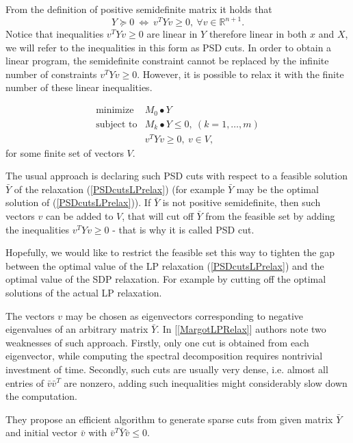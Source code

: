 \documentclass[12pt]{book}
\theoremstyle{definition}
\begin{document}
From the definition of positive semidefinite matrix it holds that
\begin{equation}
Y\succeq 0 \ \Leftrightarrow \ v^TYv \geq 0, \ \forall v\in\mathbb{R}^{n+1}.
\end{equation}
Notice that inequalities $ v^TYv \geq 0$ are linear in $Y$ therefore linear in both $x$ and $X$, we will refer to the inequalities in this form as PSD cuts.
In order to obtain a linear program, the semidefinite constraint cannot be replaced by the infinite number of constraints  $v^TYv \geq 0$.
However, it is possible to relax it with the finite number of these linear inequalities. 

\begin{equation}
\label{PSDcutsLPrelax} 
\begin{array}{ll}
\mbox{minimize}& M_0\bullet Y \\
\mbox{subject to}& M_k\bullet Y \leq 0, \  (k = 1,\dots ,m)\\
& v^TYv\geq 0, \ v\in V,
\end{array} 
\end{equation}
for some finite set of vectors $V$.

The usual approach is declaring such PSD cuts with respect to a feasible solution $\bar{Y}$ of the relaxation (\ref{PSDcutsLPrelax}) (for example $\bar{Y}$ may be the optimal solution of (\ref{PSDcutsLPrelax})). If $\bar{Y}$ is not positive semidefinite, then such vectors $v$ can be added to $V$, that will cut off $\bar{Y}$ from the feasible set by adding the inequalities $v^TYv\geq 0$ - that is why it is called PSD cut. 

Hopefully, we would like to restrict the feasible set this way to tighten the gap between the optimal value of the LP relaxation (\ref{PSDcutsLPrelax}) and the optimal value of the SDP relaxation. For example by cutting off the optimal solutions of the actual LP relaxation.


The vectors $v$ may be chosen as eigenvectors corresponding to negative eigenvalues of an arbitrary matrix $\bar{Y}$.
In [\ref{MargotLPRelax}] authors note two weaknesses of such approach. Firstly, only one cut is
obtained from each eigenvector, while computing the spectral decomposition requires nontrivial investment of time. Secondly,
such cuts are usually very dense, i.e. almost all entries of $\bar{v}\bar{v}^T$ are nonzero, adding such inequalities might considerably slow down the computation. 

They propose an efficient algorithm to generate sparse cuts from given matrix $\bar{Y}$ and initial vector $\bar{v}$ with $\bar{v}^{T}\bar{Y}\bar{v} \leq 0$. 
\end{document}
